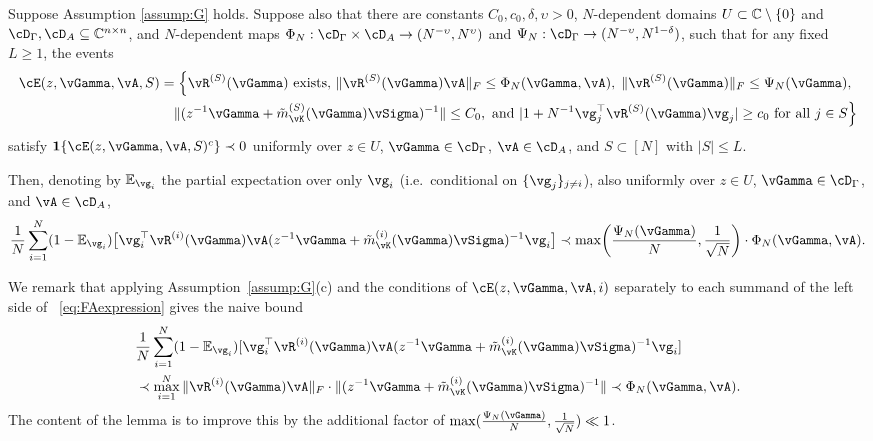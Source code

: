 \begin{lemma}\label{lemma:fluctuationavg}
Suppose Assumption \ref{assump:G} holds. Suppose also that there are constants
$C_0,c_0,\delta,\upsilon>0$, $N$-dependent
domains $U \subset \mathbb{C} \setminus \{0\}$ and
$\cD_\Gamma,\cD_A \subseteq \C^{n \times n}$, and $N$-dependent maps
$\Phi_N:\cD_\Gamma \times \cD_A \to (N^{-\upsilon},N^\upsilon)$ and
$\Psi_N:\cD_\Gamma \to (N^{-\upsilon},N^{1-\delta})$,
such that for any fixed $L \geq 1$, the events
\begin{align}
\cE(z,\vGamma,\vA,S)&=\Big\{\vR^{(S)}(\vGamma) \text{ exists, }
\|\vR^{(S)}(\vGamma)\vA\|_F \leq \Phi_N(\vGamma,\vA),\;
\|\vR^{(S)}(\vGamma)\|_F \leq \Psi_N(\vGamma),\nonumber\\
&\quad
\|(z^{-1}\vGamma+\tilde m_{\vK}^{(S)}(\vGamma) \vSigma)^{-1}\| \leq C_0, \text{ and }
|1+N^{-1} \vg_j^\top \vR^{(S)}(\vGamma)\vg_j| \geq c_0 \text{ for all } j \in S \Big\}\label{eq:ESdef}
\end{align}
satisfy $\bI\{\cE(z,\vGamma,\vA,S)^c\} \prec 0$
uniformly over $z \in U$, $\vGamma \in \cD_\Gamma$, $\vA \in \cD_A$,
and $S \subset [N]$ with $|S| \leq L$.

Then, denoting by $\E_{\vg_i}$ the partial expectation over only $\vg_i$
(i.e.\ conditional on $\{\vg_j\}_{j \neq i}$),
also uniformly over $z \in U$, $\vGamma \in \cD_\Gamma$, and $\vA \in \cD_A$,
\begin{equation}\label{eq:FAexpression}
\frac{1}{N}\sum_{i=1}^N (1-\E_{\vg_i})\big[\vg_i^\top \vR^{(i)}(\vGamma)\vA
(z^{-1}\vGamma+\tilde m_{\vK}^{(i)}(\vGamma)\vSigma)^{-1}\vg_i\big]
\prec \max\left(\frac{\Psi_N(\vGamma)}{N},\frac{1}{\sqrt{N}}\right)
\cdot \Phi_N(\vGamma,\vA).
\end{equation}
\end{lemma}

We remark that applying Assumption~\ref{assump:G}(c) and the conditions
of $\cE(z,\vGamma,\vA,i)$ separately to each summand of the left side of
~\eqref{eq:FAexpression} gives the naive bound
\begin{align*}
&\frac{1}{N}\sum_{i=1}^N (1-\E_{\vg_i})[\vg_i^\top \vR^{(i)}(\vGamma)\vA
(z^{-1}\vGamma+\tilde m_{\vK}^{(i)}(\vGamma)\vSigma)^{-1}\vg_i]\\
&\prec \max_{i=1}^N \|\vR^{(i)}(\vGamma)\vA\|_F
\cdot \|(z^{-1}\vGamma+\tilde m_{\vK}^{(i)}(\vGamma)\vSigma)^{-1}\|
\prec \Phi_N(\vGamma,\vA).
\end{align*}
The content of the lemma is to improve this by the additional
factor of $\max(\frac{\Psi_N(\vGamma)}{N},\frac{1}{\sqrt{N}})  \ll 1$.

